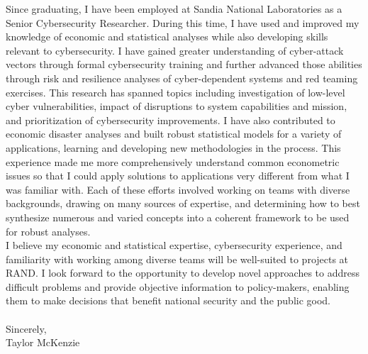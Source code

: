 \documentclass[]{article}
\begin{document}
Since graduating, I have been employed at Sandia National Laboratories as a Senior Cybersecurity Researcher. During this time, I have used and improved my knowledge of economic and statistical analyses while also developing skills relevant to cybersecurity. I have gained greater understanding of cyber-attack vectors through formal cybersecurity training and further advanced those abilities through risk and resilience analyses of cyber-dependent systems and red teaming exercises. This research has spanned topics including investigation of low-level cyber vulnerabilities, impact of disruptions to system capabilities and mission, and prioritization of cybersecurity improvements. I have also contributed to economic disaster analyses and built robust statistical models for a variety of applications, learning and developing new methodologies in the process. This experience made me more comprehensively understand common econometric issues so that I could apply solutions to applications very different from what I was familiar with. Each of these efforts involved working on teams with diverse backgrounds, drawing on many sources of expertise, and determining how to best synthesize numerous and varied concepts into a coherent framework to be used for robust analyses.\\

I believe my economic and statistical expertise, cybersecurity experience, and familiarity with working among diverse teams will be well-suited to projects at RAND. I look forward to the opportunity to develop novel approaches to address difficult problems and provide objective information to policy-makers, enabling them to make decisions that benefit national security and the public good.\\\\


\noindent Sincerely,\\

\noindent Taylor McKenzie
\end{document}
